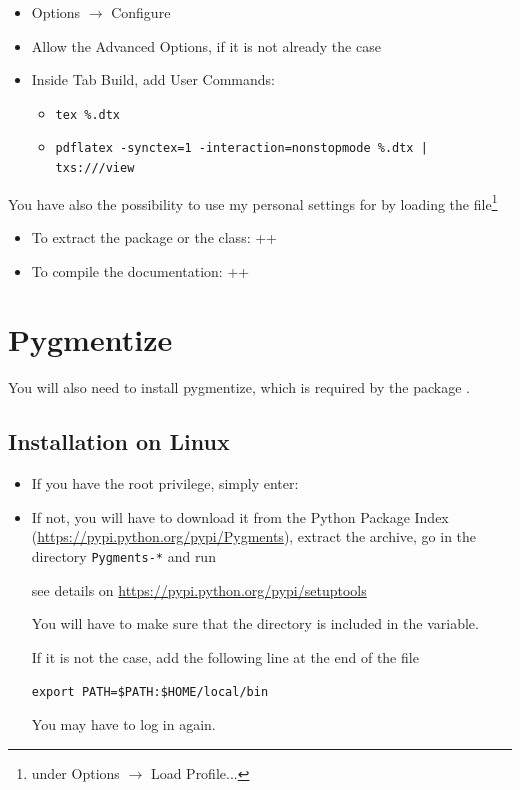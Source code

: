 \documentclass{AMdocumentation}
\begin{document}
\begin{itemize}
\item Options $\to$ Configure \TeXstudio 
\item Allow the Advanced Options, if it is not already the case
\item Inside Tab Build, add User Commands: 
	\begin{itemize}
	\item[] \verb!tex %.dtx!
	\item[] \verb!pdflatex -synctex=1 -interaction=nonstopmode %.dtx | txs:///view!
	\end{itemize}
\end{itemize}	


You have also the possibility to use my personal settings for \TeXstudio by loading
the file\footnote{under Options $\to$ Load Profile...}
\begin{center}
\end{center}

\begin{itemize}
\item To extract the package or the class: \Alt+\Shift+
\item To compile the documentation: \Alt+\Shift+
\end{itemize}




\section{Pygmentize}

You will also need to install pygmentize, which is required by the package .

\subsection{Installation on Linux}
\begin{itemize}
\item If you have the root privilege, simply enter: 
\item If not, you will have to download it from the Python Package Index (\url{https://pypi.python.org/pypi/Pygments}), 
extract the archive, go in the directory \verb|Pygments-*| and run

see details on \url{https://pypi.python.org/pypi/setuptools}

You will have to make sure that the directory  is included in the  variable.

If it is not the case, add the following line at the end of the  file
\begin{center}
\verb|export PATH=$PATH:$HOME/local/bin|
\end{center}
You may have to log in again. 

\end{itemize}
\end{document}
